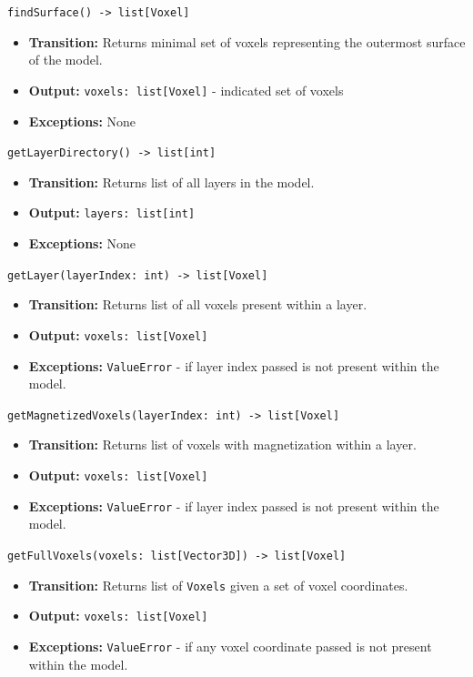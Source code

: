\documentclass[12pt, titlepage]{article}
\begin{document}
\texttt{findSurface() -> list[Voxel]}
\begin{itemize}
  \item \textbf{Transition:} Returns minimal set of voxels representing the outermost surface of the model.
  \item \textbf{Output:} \texttt{voxels: list[Voxel]} - indicated set of voxels
  \item \textbf{Exceptions:} None
\end{itemize}
\texttt{getLayerDirectory() -> list[int]}
\begin{itemize}
  \item \textbf{Transition:} Returns list of all layers in the model.
  \item \textbf{Output:} \texttt{layers: list[int]}
  \item \textbf{Exceptions:} None
\end{itemize}
\texttt{getLayer(layerIndex: int) -> list[Voxel]}
\begin{itemize}
  \item \textbf{Transition:} Returns list of all voxels present within a layer.
  \item \textbf{Output:} \texttt{voxels: list[Voxel]}
  \item \textbf{Exceptions:} \texttt{ValueError} - if layer index passed is not present within the model.
\end{itemize}
\texttt{getMagnetizedVoxels(layerIndex: int) -> list[Voxel]}
\begin{itemize}
  \item \textbf{Transition:} Returns list of voxels with magnetization within a layer.
  \item \textbf{Output:} \texttt{voxels: list[Voxel]}
  \item \textbf{Exceptions:} \texttt{ValueError} - if layer index passed is not present within the model.
\end{itemize}
\texttt{getFullVoxels(voxels: list[Vector3D]) -> list[Voxel]}
\begin{itemize}
  \item \textbf{Transition:} Returns list of \texttt{Voxels} given a set of voxel coordinates.
  \item \textbf{Output:} \texttt{voxels: list[Voxel]}
  \item \textbf{Exceptions:} \texttt{ValueError} - if any voxel coordinate passed is not present within the model.
\end{itemize}

\end{document}
